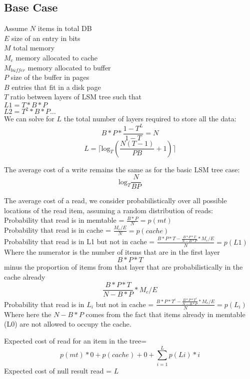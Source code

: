 \documentclass[11pt]{article}
\theoremstyle{plain}
\theoremstyle{definition}
\begin{document}
\subsection{Base Case}

Assume
$N$ items in total DB \\
$E$ size of an entry in bits \\
$M$ total memory \\
$M_c$ memory allocated to cache \\
$M_{buffer}$ memory allocated to buffer\\
$P$ size of the buffer in pages \\
$B$ entries that fit in a disk page \\
$T$ ratio between layers of LSM tree such that \\
$L1 = T * B* P$ \\
$L2 = T^2 * B*P \dots$ \\ 

We can solve for $L$ the total number of layers required to store all the data: \\
$$B*P * \frac{1-T^L}{1-T} = N$$
$$L= \lceil \textrm{log}_{T} \left(\frac{N(T-1)}{PB} + 1\right) \rceil$$

The average cost of a write remains the same as for the basic LSM tree case:
$$
\textrm{log}_{T} \frac{N}{BP}
$$

The average cost of a read, we consider probabilistically over all possible locations of the read item, assuming a random distribution of reads: \\
Probability that read is in memtable = $\frac{B*P}{N}  = p(mt)$\\
Probability that read is in cache = $\frac{M_c/E}{N} = p(cache)$ \\
Probability that read is in L1 but not in cache = $ \frac{B*P * T - \frac{B*P*T}{N-B*P} * M_c/E}{N}  = p(L1)$\\
Where the numerator is the number of items that are in the first layer $$B*P*T$$ minus the proportion of items from that layer that are probabilistically in the cache already $$\frac{B*P*T}{N-B*P} * M_c/E$$
Probability that read is in $L_i$ but not in cache = $ \frac{B*P*T^i - \frac{B*P*T^i}{N-B*P} * M_c/E}{N}  = p(L_i)$\\
Where here the $N-B*P$ comes from the fact that items already in memtable (L0) are not allowed to occupy the cache.

Expected cost of read for an item in the tree= $$p(mt) * 0  + p(cache) + 0 + \sum_{i=1}^L p(Li) * i$$ 
Expected cost of null result read = $L$ \\
\end{document}
